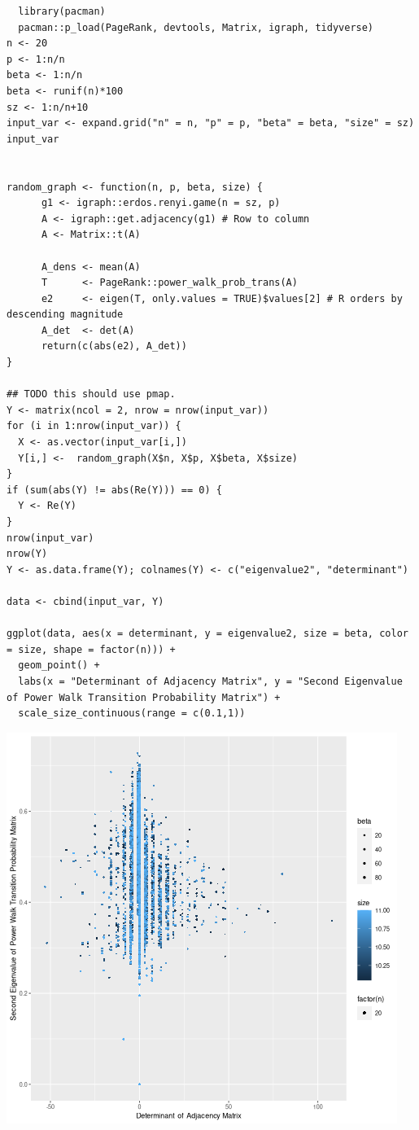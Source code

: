 \documentclass[11pt]{article}
\begin{document}
\lstset{language=r,label= ,caption= ,captionpos=b,numbers=none}
\begin{lstlisting}
  library(pacman)
  pacman::p_load(PageRank, devtools, Matrix, igraph, tidyverse)
n <- 20
p <- 1:n/n
beta <- 1:n/n
beta <- runif(n)*100
sz <- 1:n/n+10
input_var <- expand.grid("n" = n, "p" = p, "beta" = beta, "size" = sz)
input_var


random_graph <- function(n, p, beta, size) {
      g1 <- igraph::erdos.renyi.game(n = sz, p)
      A <- igraph::get.adjacency(g1) # Row to column
      A <- Matrix::t(A)

      A_dens <- mean(A)
      T      <- PageRank::power_walk_prob_trans(A)
      e2     <- eigen(T, only.values = TRUE)$values[2] # R orders by descending magnitude
      A_det  <- det(A)
      return(c(abs(e2), A_det))
}

## TODO this should use pmap.
Y <- matrix(ncol = 2, nrow = nrow(input_var))
for (i in 1:nrow(input_var)) {
  X <- as.vector(input_var[i,])
  Y[i,] <-  random_graph(X$n, X$p, X$beta, X$size)
}
if (sum(abs(Y) != abs(Re(Y))) == 0) {
  Y <- Re(Y)
}
nrow(input_var)
nrow(Y)
Y <- as.data.frame(Y); colnames(Y) <- c("eigenvalue2", "determinant")

data <- cbind(input_var, Y)

ggplot(data, aes(x = determinant, y = eigenvalue2, size = beta, color = size, shape = factor(n))) +
  geom_point() +
  labs(x = "Determinant of Adjacency Matrix", y = "Second Eigenvalue of Power Walk Transition Probability Matrix") +
  scale_size_continuous(range = c(0.1,1))
\end{lstlisting}

\begin{center}
\includegraphics[width=.9\linewidth]{../Media/EigenValue_Determinant.png}
\end{center}
\end{document}
